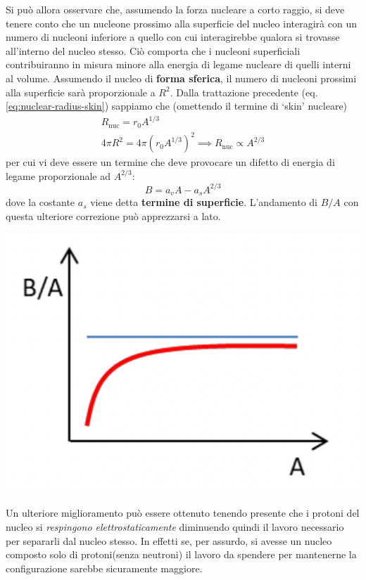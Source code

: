 Si può allora osservare che, assumendo la forza nucleare a
corto raggio, si deve tenere conto che un nucleone prossimo alla
superficie del nucleo interagirà con un numero di nucleoni inferiore a
quello con cui interagirebbe qualora si trovasse all'interno del nucleo
stesso.
Ciò comporta che i nucleoni superficiali contribuiranno in
misura minore alla energia di legame nucleare di quelli interni al
volume.
Assumendo il nucleo di \textbf{forma sferica}, il numero di
nucleoni prossimi alla superficie sarà proporzionale a \(R^{2}\).
Dalla trattazione precedente (eq. \ref{eq:nuclear-radius-skin}) sappiamo che (omettendo il termine di `skin'
nucleare) \begin{gather*}
	R_{\text{nuc}} = r_{0}A^{1/3}\\
	4 \pi R^{2} = 4 \pi (r_{0}A^{1/3})^2 \implies R_{\text{nuc}} \propto A^{2/3}
\end{gather*} per cui vi deve essere un termine che deve provocare un difetto di
energia di legame proporzionale ad \(A^{2/3}\): \[
	B = a_{v}A - a_{s}A^{2/3}
\] dove la costante \(a_{s}\) viene detta \textbf{termine di
	superficie}.
L'andamento di \(B / A\) con questa ulteriore correzione
può apprezzarsi a lato.
\begin{marginfigure}
	\includegraphics{figs/goccia2}
	\label{fig:goccia2}
\end{marginfigure}
\bigskip

Un ulteriore miglioramento può essere ottenuto tenendo presente che i
protoni del nucleo si \emph{respingono elettrostaticamente} diminuendo
quindi il lavoro necessario per separarli dal nucleo stesso.
In effetti
se, per assurdo, si avesse un nucleo composto solo di protoni(senza
neutroni) il lavoro da spendere per mantenerne la configurazione sarebbe
sicuramente maggiore.

